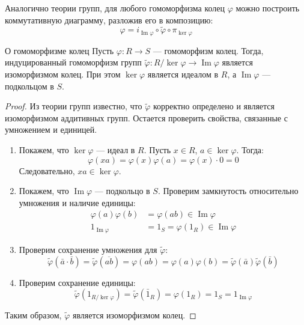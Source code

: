 \begin{Remark}{}{}
	Аналогично теории групп, для любого гомоморфизма колец $\varphi$ можно построить коммутативную диаграмму, разложив его в композицию:
	\[ \varphi = i_{\operatorname{Im}\varphi} \circ \tilde{\varphi} \circ \pi_{\ker\varphi} \]
\end{Remark}

\begin{Theorem}{О гомоморфизме колец}{}
	Пусть $\varphi\colon R \to S$ --- гомоморфизм колец. Тогда, индуцированный гомоморфизм групп $\tilde{\varphi}\colon R/\ker\varphi \to \operatorname{Im}\varphi$ является изоморфизмом колец. При этом $\ker\varphi$ является идеалом в $R$, а $\operatorname{Im}\varphi$ --- подкольцом в $S$.
\end{Theorem}

\begin{proof}
	Из теории групп известно, что $\tilde{\varphi}$ корректно определено и является изоморфизмом аддитивных групп. Остается проверить свойства, связанные с умножением и единицей.
	
	\begin{enumerate}
		\item Покажем, что $\ker\varphi$ --- идеал в $R$. Пусть $x \in R$, $a \in \ker\varphi$. Тогда:
		\[ \varphi(xa) = \varphi(x)\varphi(a) = \varphi(x) \cdot 0 = 0 \]
		Следовательно, $xa \in \ker\varphi$.
		
		\item Покажем, что $\operatorname{Im}\varphi$ --- подкольцо в $S$. Проверим замкнутость относительно умножения и наличие единицы:
		\begin{align*}
			\varphi(a)\varphi(b) &= \varphi(ab) \in \operatorname{Im}\varphi \\
			1_{\operatorname{Im}\varphi} &= 1_S = \varphi(1_R) \in \operatorname{Im}\varphi
		\end{align*}
		
		\item Проверим сохранение умножения для $\tilde{\varphi}$:
		\[ \tilde{\varphi}(\bar{a} \cdot \bar{b}) = \tilde{\varphi}(\overline{ab}) = \varphi(ab) = \varphi(a)\varphi(b) = \tilde{\varphi}(\bar{a})\tilde{\varphi}(\bar{b}) \]
		
		\item Проверим сохранение единицы:
		\[ \tilde{\varphi}(1_{R/\ker\varphi}) = \tilde{\varphi}(\bar{1}_R) = \varphi(1_R) = 1_S = 1_{\operatorname{Im}\varphi} \]
	\end{enumerate}
	Таким образом, $\tilde{\varphi}$ является изоморфизмом колец.
\end{proof}

